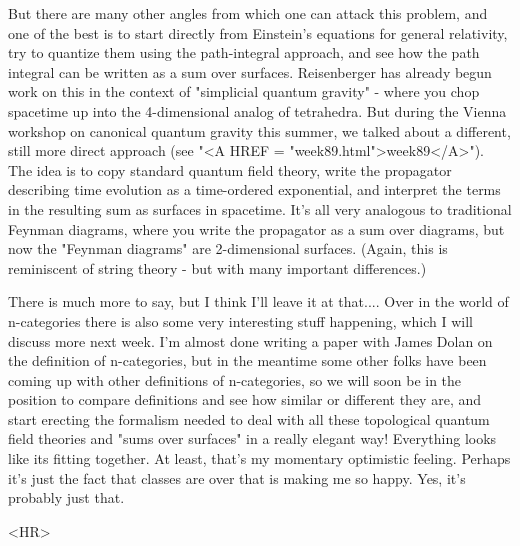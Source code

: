 But there are many other angles from which one can attack this problem,
and one of the best is to start directly from Einstein's equations
for general relativity, try to quantize them using the path-integral
approach, and see how the path integral can be written as a sum over
surfaces.  Reisenberger has already begun work on this in the context of
"simplicial quantum gravity" - where you chop spacetime up into 
the 4-dimensional analog of tetrahedra.   But during the Vienna workshop
on canonical quantum gravity this summer, we talked about a different,
still more direct approach (see "<A HREF = "week89.html">week89</A>").  The idea is to copy standard
quantum field theory, write the propagator describing time evolution
as a time-ordered exponential, and interpret the terms in the resulting
sum as surfaces in spacetime.  It's all very analogous to traditional
Feynman diagrams, where you write the propagator as a sum over diagrams,
but now the "Feynman diagrams" are 2-dimensional surfaces.   (Again, this
is reminiscent of string theory - but with many important differences.)

There is much more to say, but I think I'll leave it at that.... 
Over in the world of n-categories there is also some very interesting 
stuff happening, which I will discuss more next week.  I'm almost done
writing a paper with James Dolan on the definition of n-categories, but 
in the meantime some other folks have been coming up with other definitions of
n-categories, so we will soon be in the position to compare definitions and
see how similar or different they are, and start erecting the formalism
needed to deal with all these topological quantum field theories and
"sums over surfaces" in a really elegant way!  Everything looks like its
fitting together.  At least, that's my momentary optimistic feeling.  
Perhaps it's just the fact that classes are over that is making me so happy.  
Yes, it's probably just that.

<HR>



